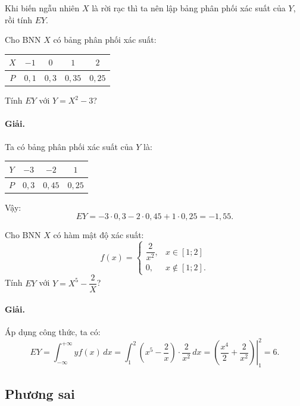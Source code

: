 \begin{chuy}
Khi biến ngẫu nhiên $X$ là rời rạc thì ta nên lập bảng phân phối xác suất của $Y$, rồi tính $EY$.
\end{chuy}

\begin{vidu}[VD 13]
Cho BNN $X$ có bảng phân phối xác suất:
\begin{center}
\begin{tabular}{|c|c|c|c|c|}
\hline
$X$ & $-1$ & $0$ & $1$ & $2$ \\
\hline
$P$ & $0{,}1$ & $0{,}3$ & $0{,}35$ & $0{,}25$ \\
\hline
\end{tabular}
\end{center}
Tính $EY$ với $Y = X^2 - 3$?

\paragraph{Giải.} Ta có bảng phân phối xác suất của $Y$ là:
\begin{center}
\begin{tabular}{|c|c|c|c|}
\hline
$Y$ & $-3$ & $-2$ & $1$ \\
\hline
$P$ & $0{,}3$ & $0{,}45$ & $0{,}25$ \\
\hline
\end{tabular}
\end{center}
Vậy:
\[
EY = -3 \cdot 0{,}3 - 2 \cdot 0{,}45 + 1 \cdot 0{,}25 = -1{,}55.
\]
\end{vidu}

\begin{vidu}[VD 14]
Cho BNN $X$ có hàm mật độ xác suất:
\[
f(x) = \begin{cases}
\dfrac{2}{x^2}, & x \in [1; 2] \\
0, & x \notin [1; 2].
\end{cases}
\]
Tính $EY$ với $Y = X^5 - \dfrac{2}{X}$?

\paragraph{Giải.} Áp dụng công thức, ta có:
\[
EY = \int_{-\infty}^{+\infty} y f(x)\,dx = \int_1^2 \left(x^5 - \frac{2}{x}\right) \cdot \frac{2}{x^2}\,dx = \left.\left(\frac{x^4}{2} + \frac{2}{x^2}\right)\right|_1^2 = 6.
\]
\end{vidu}

\subsection{Phương sai}

